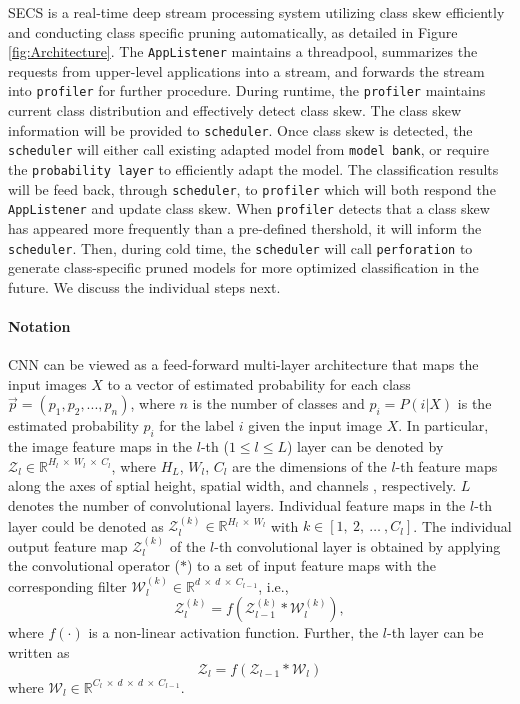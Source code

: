 \documentclass[pageno]{jpaper}
\begin{document}
SECS is a real-time deep stream processing system utilizing class skew efficiently and conducting class specific pruning automatically, as detailed in Figure \ref{fig:Architecture}. The \texttt{AppListener} maintains a threadpool, summarizes the requests from upper-level applications into a stream, and forwards the stream into \texttt{profiler} for further procedure. During runtime, the \texttt{profiler} maintains current class distribution and effectively detect class skew. The class skew information will be provided to \texttt{scheduler}. Once class skew is detected, the \texttt{scheduler} will either call existing adapted model from \texttt{model bank}, or require the \texttt{probability layer} to efficiently adapt the model. The classification results will be feed back, through \texttt{scheduler}, to \texttt{profiler} which will both respond the \texttt{AppListener} and update class skew. When \texttt{profiler} detects that a class skew has appeared more frequently than a pre-defined thershold, it will inform the \texttt{scheduler}. Then, during cold time, the \texttt{scheduler} will call \texttt{perforation} to generate class-specific pruned models for more optimized classification in the future. We discuss the individual steps next.






\paragraph{Notation}
CNN can be viewed as a feed-forward multi-layer architecture that maps the input images $X$ to a vector of estimated probability for each class $\vec{p} = (p_1, p_2, ..., p_n)$, where $n$ is the number of classes and $p_i = P(i|X)$ is the estimated probability $p_i$ for the label $i$ given the input image $X$. In particular, the image feature maps in the $l$-th ($1 \leqslant l \leqslant L$) layer can be denoted by $\mathcal{Z}_l \in \mathbb{R}^{H_l \: \times \: W_l \: \times \: C_l}$, where $H_L$, $W_l$, $C_l$ are the dimensions of the $l$-th feature maps along the axes of sptial height, spatial width, and channels , respectively. $L$ denotes the number of convolutional layers. Individual feature maps in the $l$-th layer could be denoted as $\mathcal{Z}_l^{(k)} \in \mathbb{R}^{H_l \: \times \: W_l}$ with $k \in [1, \:2, \: \dots \:, C_l]$. The individual output feature map $\mathcal{Z}_l^{(k)}$ of the $l$-th convolutional layer is obtained by applying the convolutional operator ($\ast$) to a set of input feature maps with the corresponding filter $\mathcal{W}_l^{(k)} \in \mathbb{R}^{d \: \times \: d \: \times \: C_{l-1}}$, i.e.,
\begin{equation}
    \mathcal{Z}_l^{(k)} = f(\mathcal{Z}_{l-1}^{(k)} \ast \mathcal{W}_l^{(k)}),
\end{equation}
where $f(\cdot)$ is a non-linear activation function. Further, the $l$-th layer can be written as
\begin{equation} \label{eq:1}
    \mathcal{Z}_l = f(\mathcal{Z}_{l-1} \ast \mathcal{W}_l)
\end{equation}
where $\mathcal{W}_l \in \mathbb{R}^{C_l \: \times \:   d \: \times \: d \: \times \: C_{l-1}}$.
\end{document}
